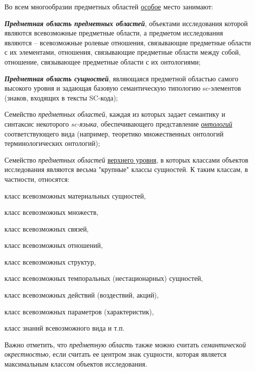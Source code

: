 \bigskip
Во всем многообразии предметных областей \uline{особое} место занимают:
\begin{textitemize}
	\item \textbf{\textit{Предметная область предметных областей}}, объектами исследования которой являются всевозможные предметные области, а предметом исследования являются -- всевозможные ролевые отношения, связывающие предметные области с их элементами, отношения, связывающие предметные области между собой, отношение, связывающее предметные области с их онтологиями;	
	\item \textbf{\textit{Предметная область сущностей}}, являющаяся предметной областью самого высокого уровня и задающая базовую семантическую типологию sc-элементов (знаков, входящих в тексты SC-кода);	
	\item Семейство \textit{предметных областей}, каждая из которых задает семантику и синтаксис некоторого \textit{sc-языка}, обеспечивающего представление \textit{\uline{онтологий}} соответствующего вида (например, теоретико множественных онтологий терминологических онтологий);	
	\item Семейство \textit{предметных областей} \uline{верхнего уровня}, в которых классами объектов исследования являются весьма "крупные"{} классы сущностей. К таким классам, в частности, относятся:	
	\begin{textitemize}	
		\item класс всевозможных материальных сущностей,	
		\item класс всевозможных множеств,	
		\item класс всевозможных связей,	
		\item класс всевозможных отношений,	
		\item класс всевозможных структур,	
		\item класс всевозможных темпоральных (нестационарных) сущностей,	
		\item класс всевозможных действий (воздествий, акций),	
		\item класс всевозможных параметров (характеристик),
		\item класс знаний всевозможного вида и т.п.	
	\end{textitemize}
\end{textitemize}

Важно отметить, что \textit{предметную область} также можно считать \textit{семантической окрестностью}, если считать ее центром знак сущности, которая является максимальным классом объектов исследования.

